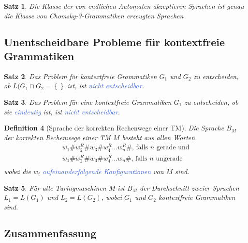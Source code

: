 \documentclass[11pt]{article}
\newcommand{\tcol}[1]{\textcolor{RoyalBlue}{#1}}
\newcommand{\set}[1]{\left\lbrace #1\right\rbrace}
\theoremstyle{break}
\newtheorem{satz}{Satz}[section]
\newtheorem{defi}[satz]{Definition}
\begin{document}
    \begin{satz}
        Die Klasse der von endlichen Automaten akzeptieren Sprachen ist genau die Klasse von Chomsky-3-Grammatiken erzeugten Sprachen
    \end{satz}


    \subsection{Unentscheidbare Probleme für kontextfreie Grammatiken}
	\label{subsec:unentscheidbare-probleme-für-kontextfreie-grammatikenindex}

    \begin{satz}
        Das Problem für kontextfreie Grammatiken $G_1$ und $G_2$ zu entscheiden, ob $L(G_1\cap G_2=\set{}$ ist, ist \tcol{nicht entscheidbar}.
    \end{satz}

    \begin{satz}
        Das Problem für eine kontextfreie Grammatiken $G_1$ zu entscheiden, ob sie \tcol{eindeutig} ist, ist \tcol{nicht entscheidbar}.
    \end{satz}

    \begin{defi}[Sprache der korrekten Rechenwege einer TM]
        Die Sprache $B_M$ der korrekten Rechenwege einer TM $M$ besteht aus allen Worten
        \begin{gather*}
            w_1\#w_2^R\#w_3\#w_4^R\dots w_n^R\#\text{, falls $n$ gerade und}\\
            w_1\#w_2^R\#w_3\#w_4^R\dots w_n\#\text{, falls $n$ ungerade}\\
        \end{gather*}
        wobei die $w_i$ \tcol{aufeinanderfolgende Konfigurationen} von $M$ sind.
    \end{defi}

    \begin{satz}
        Für alle Turingmaschinen $M$ ist $B_M$ der Durchschnitt zweier Sprachen $L_1=L(G_1)$ und $L_2=L(G_2)$, wobei $G_1$ und $G_2$ kontextfreie Grammatiken sind.
    \end{satz}


    \subsection{Zusammenfassung}
	\label{subsec:zusammenfassung}
\end{document}
